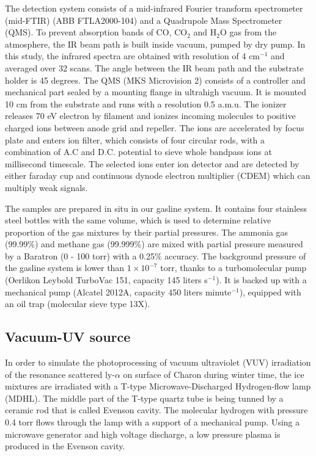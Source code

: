 The detection system consists of a mid-infrared Fourier transform spectrometer (mid-FTIR) (ABB FTLA2000-104) and a Quadrupole Mass Spectrometer (QMS). To prevent absorption bands of CO, CO$_2$ and H$_2$O gas from the atmosphere, the IR beam path is built inside vacuum, pumped by dry pump. In this study, the infrared spectra are obtained with resolution of 4 cm$^{-1}$ and averaged over 32 scans. The angle between the IR beam path and the substrate holder is 45 degrees. The QMS (MKS Microvision 2) consists of a controller and mechanical part sealed by a mounting flange in ultrahigh vacuum. It is mounted 10 cm from the substrate and runs with a resolution 0.5 a.m.u. The ionizer releases 70 eV electron by filament and ionizes incoming molecules to positive charged ions between anode grid and repeller. The ions are accelerated by focus plate and enters ion filter, which consists of four circular rods, with a combination of A.C and D.C. potential to sieve whole bandpass ions at millisecond timescale. The selected ions enter ion detector and are detected by either faraday cup and continuous dynode electron multiplier (CDEM) which can multiply weak signals.

The samples are prepared in situ in our gasline system. It contains four stainless steel bottles with the same volume, which is used to determine relative proportion of the gas mixtures by their partial pressures. The ammonia gas (99.99\%) and methane gas (99.999\%) are mixed with partial pressure measured by a Baratron (0 - 100 torr) with a 0.25\% accuracy. The background pressure of the gasline system is lower than $1 \times 10^{-7}$ torr, thanks to a turbomolecular pump (Oerlikon Leybold TurboVac 151, capacity 145 liters s$^{-1}$). It is backed up with a mechanical pump (Alcatel 2012A, capacity 450 liters minute$^{-1}$), equipped with an oil trap (molecular sieve type 13X).

\subsection{Vacuum-UV source}
\label{sec:Vacuum_UV_source}

In order to simulate the photoprocessing of vacuum ultraviolet (VUV) irradiation of the resonance scattered ly-$\alpha$ on surface of Charon during winter time, the ice mixtures are irradiated with a T-type Microwave-Discharged Hydrogen-flow lamp (MDHL). The middle part of the T-type quartz tube is being tunned by a ceramic rod that is called Evenson cavity. The molecular hydrogen with pressure 0.4 torr flows through the lamp with a support of a mechanical pump. Using a  microwave generator and high voltage discharge, a low pressure plasma is produced in the Evenson cavity.

